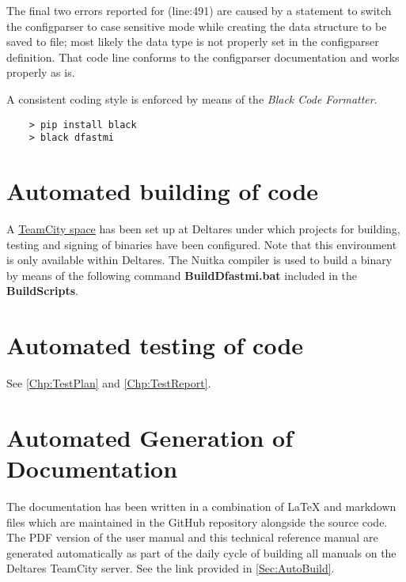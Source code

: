The final two errors reported for  (line:491) are caused by a statement to switch the configparser to case sensitive mode while creating the data structure to be saved to file; most likely the data type is not properly set in the configparser definition.
That code line conforms to the configparser documentation and works properly as is.

A consistent coding style is enforced by means of the \emph{Black Code Formatter}.

\begin{Verbatim}
    > pip install black
    > black dfastmi
\end{Verbatim}

\section{Automated building of code} \label{Sec:AutoBuild}

A \href{https://dpcbuild.deltares.nl/project/DFast_DFastMorphologicalImpact}{TeamCity space} has been set up at Deltares under which projects for building, testing and signing of binaries have been configured.
Note that this environment is only available within Deltares.
The Nuitka compiler is used to build a binary by means of the following command \textbf{BuildDfastmi.bat} included in the \textbf{BuildScripts}.

\section{Automated testing of code}

See \autoref{Chp:TestPlan} and \autoref{Chp:TestReport}.

\section{Automated Generation of Documentation}

The documentation has been written in a combination of LaTeX and markdown files which are maintained in the GitHub repository alongside the source code.
The PDF version of the user manual and this technical reference manual are generated automatically as part of the daily cycle of building all manuals on the Deltares TeamCity server.
See the link provided in \autoref{Sec:AutoBuild}.
